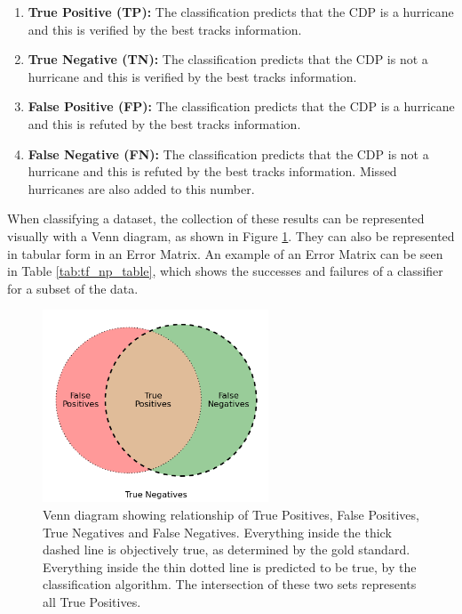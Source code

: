 \documentclass[pdftex,12pt,a4paper]{report}
\begin{document}
\begin{enumerate}
    \item \textbf{True Positive (TP):} The classification predicts that the CDP is a hurricane and
        this is verified by the best tracks information.
    \item \textbf{True Negative (TN):} The classification predicts that the CDP is not a hurricane
        and this is verified by the best tracks information.
    \item \textbf{False Positive (FP):} The classification predicts that the CDP is a hurricane and
        this is refuted by the best tracks information.
    \item \textbf{False Negative (FN):} The classification predicts that the CDP is not a hurricane
        and this is refuted by the best tracks information. Missed hurricanes are also added to this
        number.
\end{enumerate}

When classifying a dataset, the collection of these results can be represented visually with a Venn
diagram, as shown in Figure \ref{fig:tf_np_venn}. They can also be represented in tabular form in an
Error Matrix. An example of an Error Matrix can be seen in Table \ref{tab:tf_np_table}, which shows
the successes and failures of a classifier for a subset of the data.


\begin{figure}[hb!]
    \centering
    \includegraphics[width=0.6\textwidth]{figures/tf_np_venn_cropped}
    \vspace{-10pt}
    \caption{Venn diagram showing relationship of True Positives, False Positives, True Negatives and
        False Negatives. Everything inside the thick dashed line is objectively true, as determined
        by the gold standard. Everything inside the thin dotted line is predicted to be true, by the
        classification algorithm. The intersection of these two sets represents all True Positives.}
    \label{fig:tf_np_venn}
    \vspace{-10pt}
\end{figure}
\end{document}
